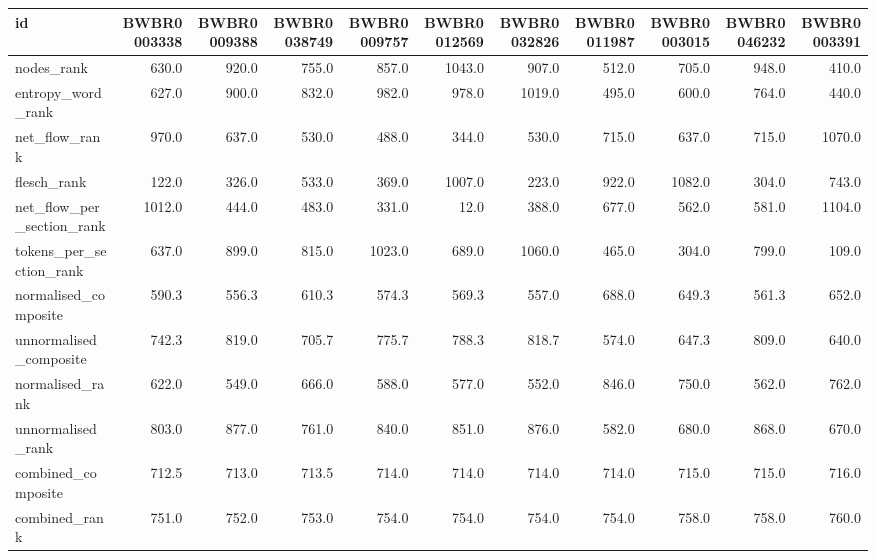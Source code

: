 \begin{tabular}{lrrrrrrrrrr}
\toprule
id & BWBR0003338 & BWBR0009388 & BWBR0038749 & BWBR0009757 & BWBR0012569 & BWBR0032826 & BWBR0011987 & BWBR0003015 & BWBR0046232 & BWBR0003391 \\
\midrule
nodes\_rank & 630.0 & 920.0 & 755.0 & 857.0 & 1043.0 & 907.0 & 512.0 & 705.0 & 948.0 & 410.0 \\
\cline{1-11}
entropy\_word\_rank & 627.0 & 900.0 & 832.0 & 982.0 & 978.0 & 1019.0 & 495.0 & 600.0 & 764.0 & 440.0 \\
\cline{1-11}
net\_flow\_rank & 970.0 & 637.0 & 530.0 & 488.0 & 344.0 & 530.0 & 715.0 & 637.0 & 715.0 & 1070.0 \\
\cline{1-11}
flesch\_rank & 122.0 & 326.0 & 533.0 & 369.0 & 1007.0 & 223.0 & 922.0 & 1082.0 & 304.0 & 743.0 \\
\cline{1-11}
net\_flow\_per\_section\_rank & 1012.0 & 444.0 & 483.0 & 331.0 & 12.0 & 388.0 & 677.0 & 562.0 & 581.0 & 1104.0 \\
\cline{1-11}
tokens\_per\_section\_rank & 637.0 & 899.0 & 815.0 & 1023.0 & 689.0 & 1060.0 & 465.0 & 304.0 & 799.0 & 109.0 \\
\cline{1-11}
normalised\_composite & 590.3 & 556.3 & 610.3 & 574.3 & 569.3 & 557.0 & 688.0 & 649.3 & 561.3 & 652.0 \\
\cline{1-11}
unnormalised\_composite & 742.3 & 819.0 & 705.7 & 775.7 & 788.3 & 818.7 & 574.0 & 647.3 & 809.0 & 640.0 \\
\cline{1-11}
normalised\_rank & 622.0 & 549.0 & 666.0 & 588.0 & 577.0 & 552.0 & 846.0 & 750.0 & 562.0 & 762.0 \\
\cline{1-11}
unnormalised\_rank & 803.0 & 877.0 & 761.0 & 840.0 & 851.0 & 876.0 & 582.0 & 680.0 & 868.0 & 670.0 \\
\cline{1-11}
combined\_composite & 712.5 & 713.0 & 713.5 & 714.0 & 714.0 & 714.0 & 714.0 & 715.0 & 715.0 & 716.0 \\
\cline{1-11}
combined\_rank & 751.0 & 752.0 & 753.0 & 754.0 & 754.0 & 754.0 & 754.0 & 758.0 & 758.0 & 760.0 \\
\cline{1-11}
\bottomrule
\end{tabular}

